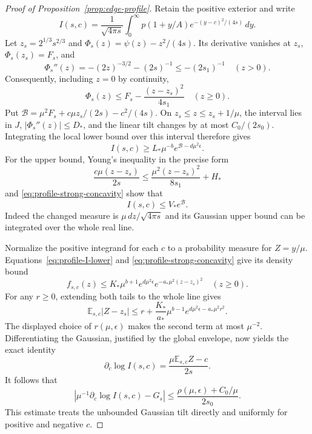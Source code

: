 \begin{proof}[Proof of Proposition~\ref{prop:edge-profile}]
Retain the positive exterior and write
\[
 I(s,c)=\frac1{\sqrt{4\pi s}}\int_0^\infty
       p(1+y/A)e^{-(y-c)^2/(4s)}\,dy.
\]
Let $z_s=2^{1/3}s^{2/3}$ and
$\Phi_s(z)=\psi(z)-z^2/(4s)$.  Its derivative vanishes at $z_s$,
$\Phi_s(z_s)=F_s$, and
\[
 \Phi_s''(z)=-(2z)^{-3/2}-(2s)^{-1}\le-(2s_1)^{-1}
 \quad(z>0).
\]
Consequently, including $z=0$ by continuity,
\begin{equation}\label{eq:profile-strong-concavity}
 \Phi_s(z)\le F_s-\frac{(z-z_s)^2}{4s_1}\quad(z\ge0).
\end{equation}
Put $\mathcal B=\mu^2F_s+c\mu z_s/(2s)-c^2/(4s)$.
On $z_s\le z\le z_s+1/\mu$, the interval lies in $J$,
$|\Phi_s''(z)|\le D_*$, and the linear tilt changes by at most
$C_0/(2s_0)$.  Integrating the local lower bound over this interval
therefore gives
\begin{equation}\label{eq:profile-I-lower}
 I(s,c)\ge L_*\mu^{-b}e^{\mathcal B-d\mu^2\epsilon}.
\end{equation}
For the upper bound, Young's inequality in the precise form
\[
 \frac{c\mu(z-z_s)}{2s}
 \le\frac{\mu^2(z-z_s)^2}{8s_1}+H_*
\]
and \eqref{eq:profile-strong-concavity} show that
\begin{equation}\label{eq:profile-I-upper}
 I(s,c)\le V_*e^{\mathcal B}.
\end{equation}
Indeed the changed measure is $\mu\,dz/\sqrt{4\pi s}$ and its Gaussian
upper bound can be integrated over the whole real line.

Normalize the positive integrand for each $c$ to a probability measure
for $Z=y/\mu$.  Equations~\eqref{eq:profile-I-lower} and
\eqref{eq:profile-strong-concavity} give its density bound
\[
 f_{s,c}(z)\le K_*\mu^{b+1}e^{d\mu^2\epsilon}
                  e^{-a_*\mu^2(z-z_s)^2}\quad(z\ge0).
\]
For any $r\ge0$, extending both tails to the whole line gives
\[
 \mathbb E_{s,c}|Z-z_s|
 \le r+\frac{K_*}{a_*}\mu^{b-1}
          e^{d\mu^2\epsilon-a_*\mu^2r^2}.
\]
The displayed choice of $r(\mu,\epsilon)$ makes the second term at
most $\mu^{-2}$.  Differentiating the Gaussian, justified by the
global envelope, now yields the exact identity
\[
 \partial_c\log I(s,c)=\frac{\mu\mathbb E_{s,c}Z-c}{2s}.
\]
It follows that
\begin{equation}\label{eq:profile-positive-derivative}
 \left|\mu^{-1}\partial_c\log I(s,c)-G_s\right|
       \le\frac{\rho(\mu,\epsilon)+C_0/\mu}{2s_0}.
\end{equation}
This estimate treats the unbounded Gaussian tilt directly and uniformly
for positive and negative $c$.


\end{proof}
